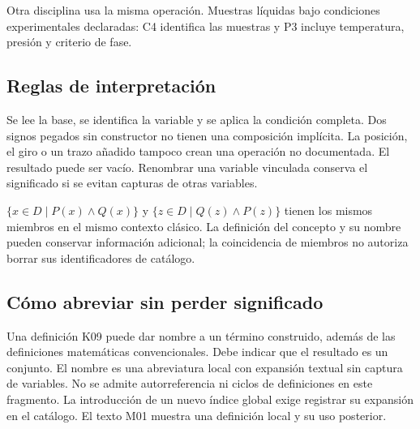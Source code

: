 
Otra disciplina usa la misma operación. Muestras líquidas bajo condiciones
experimentales declaradas:
C4 identifica las muestras y P3 incluye temperatura, presión y criterio de fase.

\subsection{Reglas de interpretación}
Se lee la base, se identifica la variable y se aplica la condición completa.
Dos signos pegados sin constructor no tienen una composición implícita. La
posición, el giro o un trazo añadido tampoco crean una operación no documentada.
El resultado puede ser vacío. Renombrar una variable vinculada conserva el
significado si se evitan capturas de otras variables.

\(\{x\in D\mid P(x)\land Q(x)\}\) y
\(\{z\in D\mid Q(z)\land P(z)\}\) tienen los mismos miembros en el mismo
contexto clásico. La definición del concepto y su nombre pueden conservar
información adicional; la coincidencia de miembros no autoriza borrar sus
identificadores de catálogo.

\subsection{Cómo abreviar sin perder significado}
Una definición K09 puede dar nombre a un término construido, además de las
definiciones matemáticas convencionales. Debe indicar que el resultado es un conjunto.
El nombre es una abreviatura local con expansión textual sin captura de variables.
No se admite autorreferencia ni ciclos de definiciones en este fragmento.
La introducción de un nuevo índice global exige registrar su expansión en el
catálogo. El texto M01 muestra una definición local y su uso posterior.
